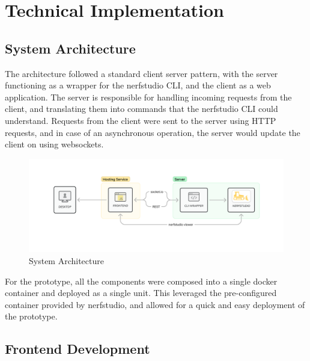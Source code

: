%
\chapter{Technical Implementation}
\label{sec:system}

\section{System Architecture}
\label{sec:system:architecture}


The architecture followed a standard client server pattern, with the server functioning as a wrapper for the nerfstudio CLI, and the client as a web application.
The server is responsible for handling incoming requests from the client, and translating them into commands that the nerfstudio CLI could understand.
Requests from the client were sent to the server using HTTP requests, and in case of an asynchronous operation, the server would update the client on using websockets.

\begin{figure}[htb]
	\includegraphics[width=\textwidth]{figures/architecture-1.png}
	\caption{System Architecture}
	\label{fig:system:example2}
\end{figure}

For the prototype, all the components were composed into a single docker container and deployed as a single unit.
This leveraged the pre-configured container provided by nerfstudio, and allowed for a quick and easy deployment of the prototype.

\section{Frontend Development} 
\label{sec:system:frontend}


